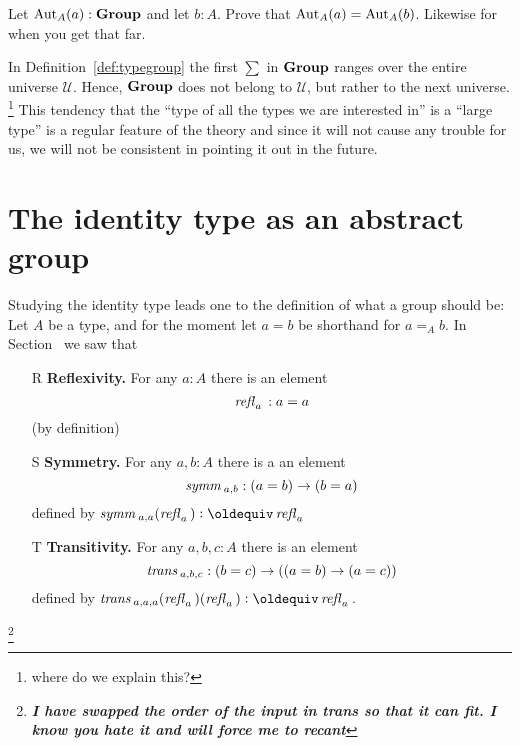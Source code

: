 \begin{xca}
   Let $\mathrm{Aut}_A(a):\mathbf{Group}$ and let $b:A$.  Prove that $\mathrm{Aut}_A(a)=\mathrm{Aut}_A(b)$.  Likewise for \inftygps when you get that far.
\end{xca}
\begin{remark}\label{rem:monoidandabsgplarge}
 In Definition~\ref{def:typegroup} the first $\sum$ in $\mathbf{Group}$ ranges over the entire universe $\mathcal U$.  Hence, $\mathbf{Group}$ does not belong to $\mathcal U$, but rather to the next universe. \footnote{where do we explain this?}  This tendency that the ``type of all the types we are interested in'' is a ``large type'' is a regular feature of the theory and since it will not cause any trouble for us, we will not be consistent in pointing it out in the future.
  \end{remark}

\section{The identity type as an abstract group }
Studying the identity type leads one to the definition of what a group should be:
Let $A$ be a type, and for the moment let $a=b$ be shorthand for $a=_Ab$.  In Section~ we saw that
\begin{enumerate}
\item[R] {\bf Reflexivity.} For any $a:A$ there is an element 
$$\mathop{{\it refl}_{a}}{}:a=a$$ (by definition)
\item[S] {\bf Symmetry.} For any $a,b:A$ there is a an element $$\mathop{\mathit{symm}}{}_{a,b}:(a=b)\to (b=a)$$ defined by $\symm{}_{a,a}(\refl a{})\defequi\refl a{}$
\item[T] {\bf Transitivity.} For any $a,b,c:A$ there is an element $$\mathop{\mathit{trans}}{}_{a,b,c}:(b=c)\to((a=b)\to(a=c))$$ defined by $\trans{}_{a,a,a}(\refl a{})(\refl a{})\defequi \refl a{}$.
\end{enumerate}
\footnote{\em\bf I have swapped the order of the input in trans so that it can fit.  I know you hate it and will force me to recant}

